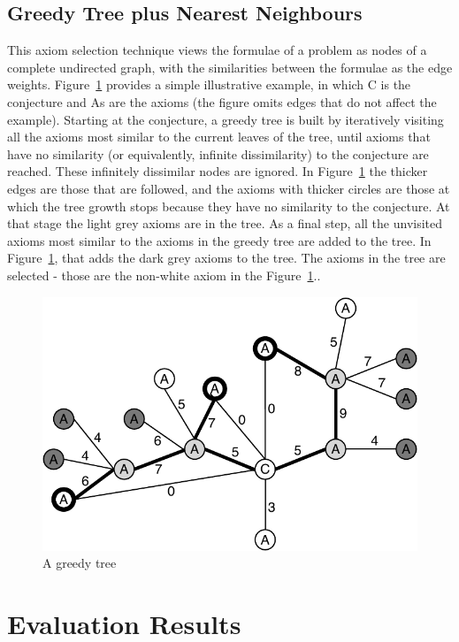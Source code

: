 \documentclass[EPiC]{easychair}
\begin{document}
\subsection{Greedy Tree plus Nearest Neighbours}
\label{Zihao}

This axiom selection technique views the formulae of a problem as nodes
of a complete undirected graph, with the similarities between the formulae 
as the edge weights.
Figure~\ref{GreedyTree} provides a simple illustrative example, in which
{\sf C} is the conjecture and {\sf A}s are the axioms (the figure
omits edges that do not affect the example).
Starting at the conjecture, a greedy tree is built by iteratively visiting all
the axioms most similar to the current leaves of the tree, until axioms that 
have no similarity (or equivalently, infinite dissimilarity) 
to the conjecture are reached. 
These infinitely dissimilar nodes are ignored.
In Figure~\ref{GreedyTree} the thicker edges are those that are followed,
and the axioms with thicker circles are those at which the tree growth 
stops because they have no similarity to the conjecture.
At that stage the light grey axioms are in the tree.
As a final step, all the unvisited axioms most similar to the axioms in the 
greedy tree are added to the tree.
In Figure~\ref{GreedyTree}, that adds the dark grey axioms to the tree.
The axioms in the tree are selected - those are the non-white axiom in
the Figure~\ref{GreedyTree}..

\begin{figure}[h]
\centering
\includegraphics[width=0.5\linewidth]{GreedyTree+NN.pdf}
\caption{A greedy tree}
\label{GreedyTree}
\end{figure}

\section{Evaluation Results}
\label{Results}
\end{document}
